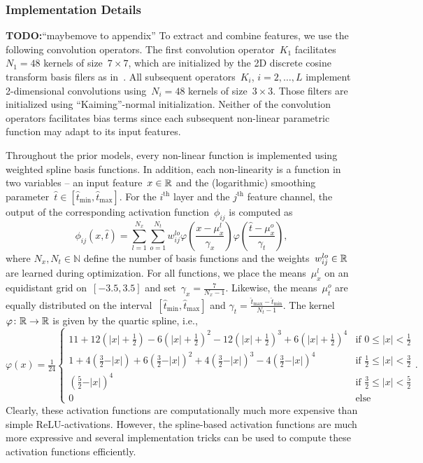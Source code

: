 \documentclass{article} %
\theoremstyle{plain}
\theoremstyle{definition}
\theoremstyle{remark}
\newcommand{\todo}[1]{{\color{red}\textbf{TODO:}``#1''}}
\newcommand{\N}{\mathbb{N}}
\def\hatt{{\widehat{t}}}
\newcommand{\tminh}{\hatt_\mathrm{min}}
\newcommand{\tmaxh}{\hatt_\mathrm{max}}
\begin{document}
\subsubsection{Implementation Details}
\todo{maybemove to appendix}
To extract and combine features, we use the following convolution operators.
The first convolution operator~$K_1$ facilitates~$N_1=48$ kernels of size~$7\times 7$, which are initialized by the 2D discrete cosine transform basis filers as in~\citet{ChPo16,KoKl17}.
All subsequent operators~$K_i$, $i=2,\ldots,L$ implement 2-dimensional convolutions using~$N_i=48$ kernels of size~$3\times 3$.
Those filters are initialized using ``Kaiming''-normal initialization.
Neither of the convolution operators facilitates bias terms since each subsequent non-linear parametric function may adapt to its input features.

Throughout the prior models, every non-linear function is implemented using weighted spline basis functions.
In addition, each non-linearity is a function in two variables -- an input feature~$x\in\mathbb{R}$ and the (logarithmic) smoothing parameter~$\widehat{t}\in[\tminh,\tmaxh]$.
For the $i^\text{th}$ layer and the $j^\text{th}$ feature channel, the output of the corresponding activation function~$\phi_{ij}$ is computed as
\[
\phi_{ij}(x,\widehat{t}) = \sum_{l=1}^{N_x}\sum_{o=1}^{N_t} w_{ij}^{lo} \varphi\left(\frac{x-\mu_x^l}{\gamma_x}\right) \varphi\left(\frac{\widehat{t}-\mu_x^o}{\gamma_t}\right),
\]
where $N_x,N_t\in\N$ define the number of basis functions and the weights~$w_{ij}^{lo}\in\mathbb{R}$ are learned during optimization.
For all functions, we place the means~$\mu_x^l$ on an equidistant grid on~$[-3.5,3.5]$ and set~$\gamma_x=\frac{7}{N_x-1}$.
Likewise, the means~$\mu_t^o$ are equally distributed on the interval~$[\tminh,\tmaxh]$ and $\gamma_t=\frac{\tmaxh-\tminh}{N_t-1}$.
The kernel~$\varphi\colon\mathbb{R}\to\mathbb{R}$ is given by the quartic spline, i.e.,
\[
\varphi(x)=\tfrac{1}{24}
\begin{cases}
11 + 12(\vert x\vert+\frac12) - 6(\vert x\vert+\frac12)^2 - 12(\vert x\vert+\frac12)^3 + 6(\vert x\vert+\frac12)^4 &\text{if } 0\leq\vert x\vert< \frac12\\
1 + 4(\frac32-\vert x\vert) + 6(\frac32-\vert x\vert)^2 + 4(\frac32-\vert x\vert)^3 - 4(\frac32-\vert x\vert)^4 &\text{if } \frac12\leq \vert x\vert< \frac32\\
(\frac52-\vert x\vert)^4 &\text{if } \frac32\leq \vert x\vert<\frac52\\
0 &\text{else}
\end{cases}.
\]
Clearly, these activation functions are computationally much more expensive than simple ReLU-activations.
However, the spline-based activation functions are much more expressive and several implementation tricks can be used to compute these activation functions efficiently.
\end{document}
